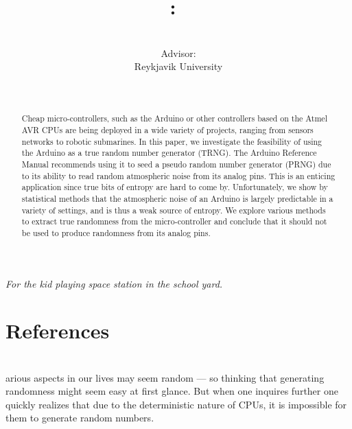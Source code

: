 \documentclass[a4paper]{article}           %
\title{
    \Class:\ \Title
    }
\date{\small{\DueLang\ \DueDate}}
\author{\AuthorName\\Advisor: \ClassInstructor\\Reykjavik University}
\newcommand{\tmpsection}[1]{}
\let\tmpsection=\section
\renewcommand{\section}[2]{

    \ifthenelse{
      \equal{#2}{*} %
    }
    {
      \tmpsection{References}
      \tmpsection{\sc{#2} }
    }
    {\tmpsection{\sc{#1} } }
      

}
\begin{document}
\maketitle

\begin{center}
\textit{For the kid playing space station in the school yard. }
\end{center}



\begin{abstract}

  Cheap micro-controllers, such as the Arduino or other controllers
  based on the Atmel AVR CPUs are being deployed in a wide variety of
  projects, ranging from sensors networks to robotic submarines. In
  this paper, we investigate the feasibility of using the Arduino as a
  true random number generator (TRNG). The Arduino Reference Manual
  recommends using it to seed a pseudo random number generator (PRNG)
  due to its ability to read random atmospheric noise from its
  analog pins. This is an enticing application since true bits
  of entropy are hard to come by. Unfortunately, we show by
  statistical methods that the atmospheric noise of an Arduino is
  largely predictable in a variety of settings, and is thus a weak
  source of entropy. We explore various methods to extract true
  randomness from the micro-controller and conclude that it should not
  be used to produce randomness from its analog pins.

\end{abstract}

\section{Introduction}

Various aspects in our lives may seem random --- so thinking that generating randomness might seem easy at first glance. But when one inquires further one quickly realizes that due to the deterministic nature of CPUs, it is impossible for them to generate random numbers. 
\end{document}
